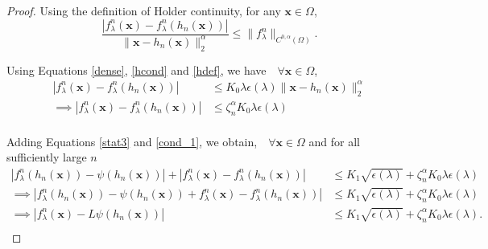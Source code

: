 \documentclass[multixcb]{amstext-l}
\theoremstyle{plain}
\theoremstyle{definition}
\theoremstyle{definition}
\theoremstyle{remark}
\numberwithin{equation}{chapter}
\begin{document}
\begin{proof}
Using the definition of Holder continuity, for any $\boldsymbol{x}\in\Omega$, 
\begin{equation}\label{hdef}
    \frac{\left| f^n_{\lambda}(\boldsymbol{x}) - f^n_{\lambda}(h_n(\boldsymbol{x}))   \right|}{\|\boldsymbol{x}-h_n(\boldsymbol{x})\|^{\alpha}_2} \le \| f^n_{\lambda} \|_{C^{0,\alpha}(\Omega)}.
\end{equation}

Using Equations \ref{dense}, \ref{hcond} and \ref{hdef}, we have $ \mbox{   }\forall \boldsymbol{x}\in\Omega$,
\begin{equation}\label{stat3}\begin{aligned}
    \left| f^n_{\lambda}(\boldsymbol{x}) - f^n_{\lambda}(h_n(\boldsymbol{x}))   \right| &\le K_0\lambda\epsilon(\lambda)\|\boldsymbol{x}-h_n(\boldsymbol{x})\|^{\alpha}_2 \\
    \implies \left| f^n_{\lambda}(\boldsymbol{x}) - f^n_{\lambda}(h_n(\boldsymbol{x}))   \right| &\le \zeta_n^{\alpha} K_0\lambda\epsilon(\lambda) \\
    \end{aligned}
\end{equation}

Adding Equations \ref{stat3} and \ref{cond_1}, we obtain, $ \mbox{   }\forall \boldsymbol{x}\in\Omega$ and for all sufficiently large $n$
\begin{equation}\label{inter_2}
    \begin{aligned}
        \left|f^n_{\lambda}(h_n(\boldsymbol{x}))-\psi(h_n(\boldsymbol{x})) \right| + \left| f^n_{\lambda}(\boldsymbol{x}) - f^n_{\lambda}(h_n(\boldsymbol{x})) \right| &\le K_1\sqrt{\epsilon(\lambda)} + \zeta_n^{\alpha}K_0\lambda\epsilon(\lambda)\\
       \implies \left|f^n_{\lambda}(h_n(\boldsymbol{x}))-\psi(h_n(\boldsymbol{x}))  +  f^n_{\lambda}(\boldsymbol{x}) - f^n_{\lambda}(h_n(\boldsymbol{x})) \right| &\le K_1\sqrt{\epsilon(\lambda)} +\zeta_n^{\alpha}K_0\lambda\epsilon(\lambda)\\
       \implies \left| f^n_{\lambda}(\boldsymbol{x}) -L\psi(h_n(\boldsymbol{x})) \right| &\le K_1\sqrt{\epsilon(\lambda)} + \zeta_n^{\alpha}K_0\lambda\epsilon(\lambda).\\
    \end{aligned}
\end{equation}


\end{proof}
\end{document}
